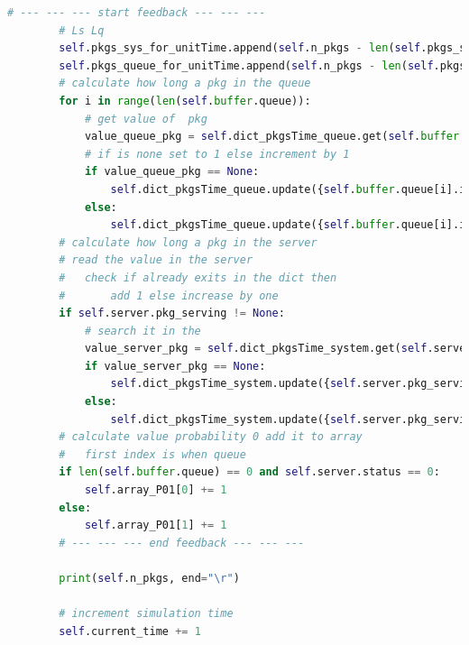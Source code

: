 \documentclass[12pt,a4paper]{article}
\begin{document}
\begin{lstlisting}[language=Python, caption=System Method Simulation]
        # --- --- --- start feedback --- --- ---
        # Ls Lq
        self.pkgs_sys_for_unitTime.append(self.n_pkgs - len(self.pkgs_served))
        self.pkgs_queue_for_unitTime.append(self.n_pkgs - len(self.pkgs_served) - self.server.status)
        # calculate how long a pkg in the queue
        for i in range(len(self.buffer.queue)):
            # get value of  pkg 
            value_queue_pkg = self.dict_pkgsTime_queue.get(self.buffer.queue[i].id_number)
            # if is none set to 1 else increment by 1 
            if value_queue_pkg == None:
                self.dict_pkgsTime_queue.update({self.buffer.queue[i].id_number: 1})
            else:
                self.dict_pkgsTime_queue.update({self.buffer.queue[i].id_number: value_queue_pkg + 1})
        # calculate how long a pkg in the server 
        # read the value in the server 
        #   check if already exits in the dict then 
        # 		add 1 else increase by one 
        if self.server.pkg_serving != None:
            # search it in the 
            value_server_pkg = self.dict_pkgsTime_system.get(self.server.pkg_serving.id_number)
            if value_server_pkg == None:
                self.dict_pkgsTime_system.update({self.server.pkg_serving.id_number: 1})
            else:
                self.dict_pkgsTime_system.update({self.server.pkg_serving.id_number: value_server_pkg + 1})
        # calculate value probability 0 add it to array 
        # 	first index is when queue
        if len(self.buffer.queue) == 0 and self.server.status == 0:
            self.array_P01[0] += 1
        else:
            self.array_P01[1] += 1
        # --- --- --- end feedback --- --- ---
        
        print(self.n_pkgs, end="\r")

        # increment simulation time 
        self.current_time += 1
\end{lstlisting}

\newpage
\end{document}
